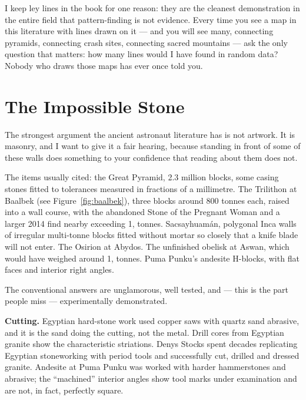 I keep ley lines in the book for one reason: they are the cleanest demonstration in the
entire field that pattern-finding is not evidence.  Every time
you see a map in this literature with lines drawn on it --- and you will see many, connecting
pyramids, connecting crash sites, connecting sacred mountains --- ask the only question that
matters: how many lines would I have found in random data? Nobody who draws those maps has
ever once told you.

\section{The Impossible Stone}\label{sec:impossiblestone}

The strongest argument the ancient astronaut literature has is not artwork. It is masonry, and
I want to give it a fair hearing, because standing in front of some of these walls does
something to your confidence that reading about them does not.

The items usually cited: the Great Pyramid, 2.3 million blocks, some casing stones fitted to
tolerances measured in fractions of a millimetre. The Trilithon at Baalbek (see Figure~\ref{fig:baalbek}), three blocks around
800 tonnes each, raised into a wall course, with the abandoned Stone of the Pregnant Woman and
a larger 2014 find nearby exceeding 1, tonnes. Sacsayhuam\'an, polygonal Inca walls of
irregular multi-tonne blocks fitted without mortar so closely that a knife blade will not
enter. The Osirion at Abydos. The unfinished obelisk at Aswan, which would have weighed around
1, tonnes. Puma Punku's andesite H-blocks, with flat faces and interior right angles.

The conventional answers are unglamorous, well tested, and --- this is the part people miss ---
experimentally demonstrated.

\textbf{Cutting.} Egyptian hard-stone work used copper saws with quartz sand abrasive, and it
is the sand doing the cutting, not the metal. Drill cores from Egyptian granite show the
characteristic striations. Denys Stocks spent decades replicating Egyptian stoneworking with
period tools and successfully cut, drilled and dressed granite. Andesite at Puma Punku was
worked with harder hammerstones and abrasive; the ``machined'' interior angles show tool marks
under examination and are not, in fact, perfectly square.

